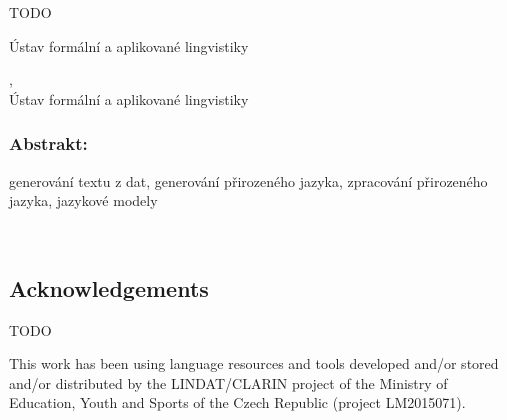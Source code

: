 \documentclass[12pt,notitlepage,a4paper,openright]{report}
\begin{document}
\cleardoublepage{}
\begin{description}[leftmargin=7.5em,labelwidth=7em,labelindent=0em,labelsep=0.5em]
  \item[Název práce:] TODO
  \item[Autor:] \theauthor{}
  \item[Katedra:] Ústav formální a aplikované lingvistiky
  \item[Vedoucí práce:] \thesupervisor,\\ Ústav formální a aplikované lingvistiky
\end{description}

\subsubsection{Abstrakt:}



\begin{description}[leftmargin=7.5em,labelwidth=7em,labelindent=0em,labelsep=0.5em]
  \item[Klíčová slova:] generování textu z dat, generování přirozeného jazyka, zpracování přirozeného jazyka, jazykové modely
\end{description}





\cleardoublepage{}
\ \vspace{10mm}

\subsection*{Acknowledgements}

{

  TODO


}

\vfill


{\noindent\footnotesize %
  This work has been using language resources and tools developed and/or stored and/or distributed by the  LINDAT/CLARIN project of the Ministry of Education, Youth and Sports of the Czech Republic (project LM2015071).
}
\end{document}

